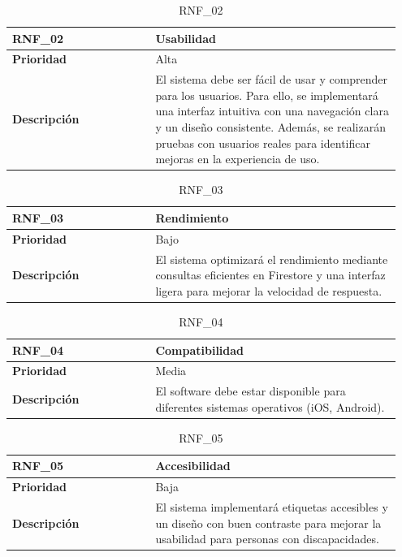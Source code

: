 \begin{table}[htb!]
    \begin{tabular}{|p{0.35\linewidth}|p{0.6\linewidth}|}
        \hline
        \rowcolor[HTML]{C0C0C0}
        \textbf{RNF\_02} & \textbf{Usabilidad} \\
        \hline
        \textbf{Prioridad} & Alta \\
        \hline
        \textbf{Descripción} & 
        El sistema debe ser fácil de usar y comprender para los usuarios. 
        Para ello, se implementará una interfaz intuitiva con una navegación clara y un diseño consistente. 
        Además, se realizarán pruebas con usuarios reales para identificar mejoras en la experiencia de uso. \\
        \hline
    \end{tabular}
    \caption{RNF\_02}
\end{table}


\begin{table}[htb!]
    \begin{tabular}{|p{0.35\linewidth}|p{0.6\linewidth}|}
        \hline
        \rowcolor[HTML]{C0C0C0}
        \textbf{RNF\_03} & \textbf{Rendimiento} \\
        \hline
        \textbf{Prioridad} & Bajo \\
        \hline
        \textbf{Descripción} & 
        El sistema optimizará el rendimiento mediante consultas eficientes en Firestore y una interfaz ligera para mejorar la velocidad de respuesta. \\
        \hline
    \end{tabular}
    \caption{RNF\_03}
\end{table}



\begin{table}[htb!]
    \begin{tabular}{|p{0.35\linewidth}|p{0.6\linewidth}|}
        \hline
        \rowcolor[HTML]{C0C0C0}
        \textbf{RNF\_04} & \textbf{Compatibilidad} \\
        \hline
        \textbf{Prioridad} & Media \\
        \hline
        \textbf{Descripción} & El software debe estar disponible para diferentes sistemas operativos (iOS, Android). \\
        \hline
    \end{tabular}
    \caption{RNF\_04}
\end{table}

\begin{table}[htb!]
    \begin{tabular}{|p{0.35\linewidth}|p{0.6\linewidth}|}
        \hline
        \rowcolor[HTML]{C0C0C0}
        \textbf{RNF\_05} & \textbf{Accesibilidad} \\
        \hline
        \textbf{Prioridad} & Baja \\
        \hline
        \textbf{Descripción} & 
        El sistema implementará etiquetas accesibles y un diseño con buen contraste para mejorar la usabilidad para personas con discapacidades. \\
        \hline
    \end{tabular}
    \caption{RNF\_05}
\end{table}


